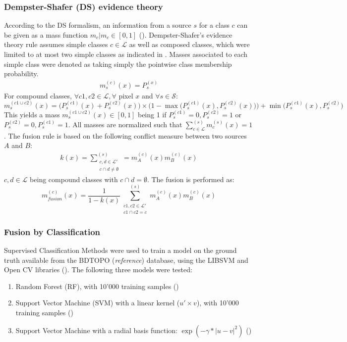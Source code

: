\documentclass[10pt]{article}
\begin{document}
\subsubsection{Dempster-Shafer (DS) evidence theory}\label{sec:DS}
According to the DS formalism, an information from a source $s$ for a class $c$ can be given as a mass function $m_c\vert m_c\in [0,1]$ (\cite{shafer-evidence}). Dempster-Shafer's evidence theory rule assumes simple classes $c\in \mathcal{L}$ as well as composed classes, which were limited to at most two simple classes as indicated in \cite{ouerghemmi_two-step_2017}. Masses associated to each simple class were denoted as taking simply the pointwise class membership probability.
\begin{align}
    m_s^{(c)}(x)=P_s^{(x)}
\end{align}
For compound classes, $\forall c1,c2\in \mathcal{L}, \forall$ pixel $x$ and $\forall s\in \mathcal{S}$:
\begin{equation}
    m_s^{(c1\cup c2)}(x)=\big(P_s^{(c1)}(x)+P_s^{(c2)}(x)\big)\times \Big(1-\max\big(P_s^{(c1)}(x),P_s^{(c2)}(x)\big)\Big)+\min\big(P_s^{(c1)}(x),P_s^{(c2)}\big)
\end{equation}
This yields a mass $m_s^{(c1\cup c2)}(x)\in [0,1]$ being 1 if $P_s^{(c1)}=0, P_s^{(c2)}=1$ or $P_s^{(c2)}=0, P_s^{(c1)}=1$. All masses are normalized such that $\sum_{c \in \mathcal{L}}^{(s)}m_c^{(s)}(x)=1$.
The fusion rule is based on the following conflict measure between two sources $A$ and $B$:
\begin{align}
    k(x)=\sum_{\substack{c,d\in\mathcal{L}'\\c\cap d\neq\emptyset}}^{(s)}=m_A^{(c)}(x)m_B^{(c)}(x)
\end{align}
$c,d\in\mathcal{L}$ being compound classes with $c\cap d =\emptyset$. The fusion is performed as:
\begin{equation}
    m_{fusion}^{(c)}(x)=\frac{1}{1-k(x)}\sum_{\substack{c1,c2\in\mathcal{L}'\\c1 \cap c2 = c}}^{(s)}m_A^{(c)}(x)m_B^{(c)}(x)
\end{equation}

\subsubsection{Fusion by Classification}
Supervised Classification Methods were used to train a model on the ground truth available from the BDTOPO (\textit{reference}) database, using the LIBSVM and Open CV libraries (\cite{libsvm,opencv}). The following three models were tested:  %
\begin{enumerate}
    \item Random Forest (RF), with 10'000 training samples (\cite{opencv})
    \item Support Vector Machine (SVM) with a linear kernel ($u'\times v$), with 10'000 training samples (\cite{libsvm})
    \item Support Vector Machine with a radial basis function: $\exp(-\gamma*|u-v|^2)$ (\cite{libsvm})
\end{enumerate}
\end{document}
